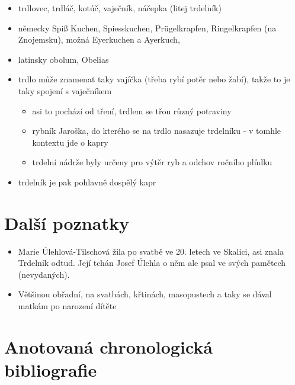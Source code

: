 \begin{itemize}
\tightlist
\item
  trdlovec, trdláč, kotúč, vaječník, náčepka (litej trdelník)
\item
  německy Spiß Kuchen, Spiesskuchen, Prügelkrapfen, Ringelkrapfen (na
  Znojemsku), možná Eyerkuchen a Ayerkuch,
\item
  latinsky obolum, Obelias
\item
  trdlo může znamenat taky vajíčka (třeba rybí potěr nebo žabí), takže
  to je taky spojení s vaječníkem

  \begin{itemize}
  \tightlist
  \item
    asi to pochází od tření, trdlem se třou různý potraviny
  \item
    rybník Jaroška, do kterého se na trdlo nasazuje trdelníku - v tomhle
    kontextu jde o kapry
  \item
    trdelní nádrže byly určeny pro výtěr ryb a odchov ročního plůdku
  \end{itemize}
\item
  trdelník je pak pohlavně dospělý kapr
\end{itemize}

\section{Další poznatky}\label{Dalux161uxedux20poznatky}

\begin{itemize}
\tightlist
\item
  Marie Úlehlová-Tilschová žila po svatbě ve 20. letech ve Skalici, asi
  znala Trdelník odtud. Její tchán Josef Úlehla o něm ale psal ve svých
  pamětech (nevydaných).
\end{itemize}

\begin{itemize}
\tightlist
\item
  Většinou obřadní, na svatbách, křtinách, masopustech a taky se dával
  matkám po narození dítěte
\end{itemize}

\section{Anotovaná chronologická
bibliografie}\label{Anotovanuxe1ux20chronologickuxe1ux20bibliografie}

